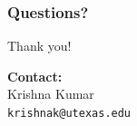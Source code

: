 \documentclass{beamer}
\begin{document}
\begin{frame}
\frametitle{Questions?}
\begin{center}
\Huge Thank you!
\end{center}

\vspace{2em}

\begin{center}
\textbf{Contact:}\\
Krishna Kumar\\
\texttt{krishnak@utexas.edu}\\
\end{center}
\end{frame}
\end{document}
